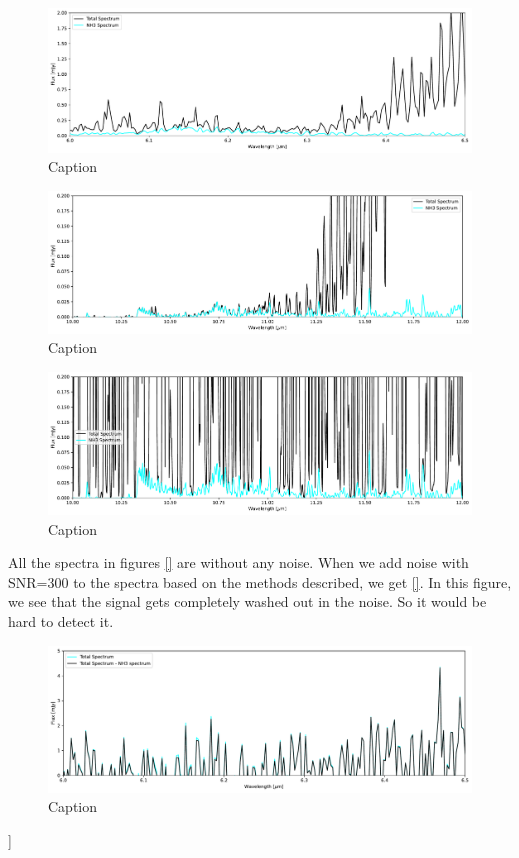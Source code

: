 \documentclass[twoside, single, authoryear, semicolon]{lion-msc}
\newcommand{\4}{$_4$}
\newcommand{\3}{$_3$}
\newcommand{\2}{$_2$}
\begin{document}
\begin{figure}[!ht]
    \centering
    \includegraphics[width=\linewidth]{Figures/NH3_region1.pdf}
    \caption{Caption}
    \label{fig:enter-label}
\end{figure}
\begin{figure}[!ht]
    \centering
    \includegraphics[width=\linewidth]{Figures/NH3_region2.pdf}
    \caption{Caption}
    \label{fig:enter-label}
\end{figure}
\begin{figure}[!ht]
    \centering
    \includegraphics[width=\linewidth]{Figures/NH3_region3.pdf}
    \caption{Caption}
    \label{fig:enter-label}
\end{figure}
All the spectra in figures \ref{} are without any noise. When we add noise with SNR=300 to the spectra based on the methods described, we get \ref{}. In this figure, we see that the signal gets completely washed out in the noise. So it would be hard to detect it. 
\begin{figure}[!ht]
    \centering
    \includegraphics[width=\linewidth]{Figures/AddNoise.pdf}
    \caption{Caption}
    \label{fig:enter-label}
\end{figure}
]
\end{document}
